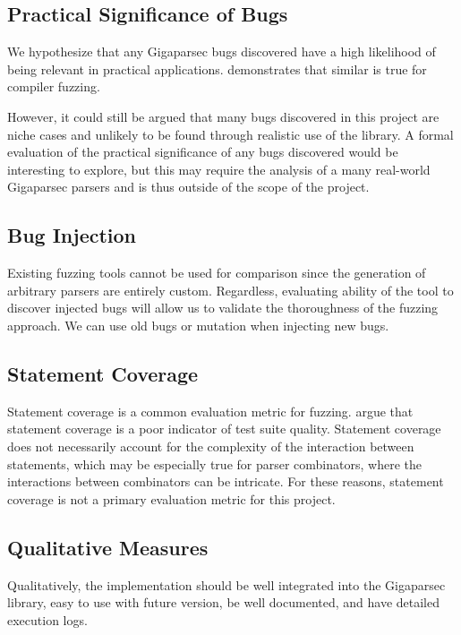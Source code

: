 \documentclass{article}
\let\oldciteauthor\citeauthor
\renewcommand{\citeauthor}[1]{\oldciteauthor{#1} \cite{#1}}
\begin{document}
\subsection{Practical Significance of Bugs}

We hypothesize that any Gigaparsec bugs discovered have a high likelihood of being relevant in practical applications. \citeauthor{fuzzing-importance} demonstrates that similar is true for compiler fuzzing.

However, it could still be argued that many bugs discovered in this project are niche cases and unlikely to be found through realistic use of the library. A formal evaluation of the practical significance of any bugs discovered would be interesting to explore, but this may require the analysis of a many real-world Gigaparsec parsers and is thus outside of the scope of the project.

\subsection{Bug Injection}

Existing fuzzing tools cannot be used for comparison since the generation of arbitrary parsers are entirely custom. Regardless, evaluating ability of the tool to discover injected bugs will allow us to validate the thoroughness of the fuzzing approach. We can use old bugs or mutation when injecting new bugs.

\subsection{Statement Coverage}

Statement coverage is a common evaluation metric for fuzzing. \citeauthor{coverage} argue that statement coverage is a poor indicator of test suite quality. Statement coverage does not necessarily account for the complexity of the interaction between statements, which may be especially true for parser combinators, where the interactions between combinators can be intricate. For these reasons, statement coverage is not a primary evaluation metric for this project.

\subsection{Qualitative Measures}

Qualitatively, the implementation should be well integrated into the Gigaparsec library, easy to use with future version, be well documented, and have detailed execution logs.
\end{document}
